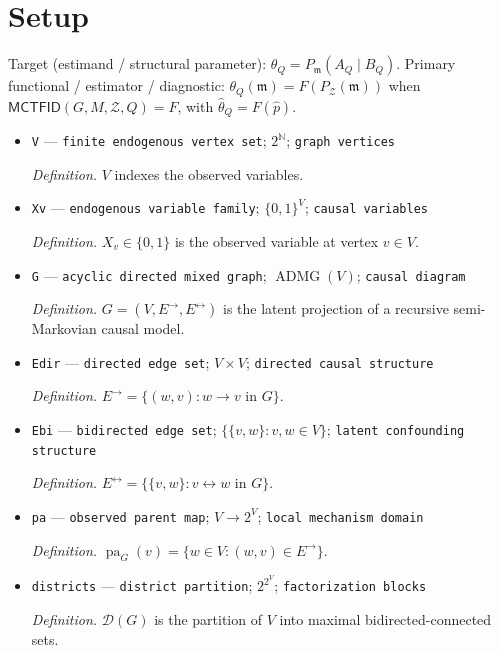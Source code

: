 \documentclass{article}
\begin{document}
\section{Setup}

Target (estimand / structural parameter): \(\theta_Q=P_{\mathfrak m}(A_Q\mid B_Q)\).
Primary functional / estimator / diagnostic: \(\theta_Q(\mathfrak m)=F(P_{\mathcal Z}(\mathfrak m))\) when \(\mathsf{MCTFID}(G,M,\mathcal Z,Q)=F\), with \(\widehat\theta_Q=F(\widehat p)\).
\begin{itemize}
  \item \texttt{V} --- \texttt{finite endogenous vertex set}; \(2^{\mathbb N}\); \texttt{graph vertices}
  \par\smallskip\noindent\emph{Definition.} \(V\) indexes the observed variables.
  \item \texttt{Xv} --- \texttt{endogenous variable family}; \(\{0,1\}^{V}\); \texttt{causal variables}
  \par\smallskip\noindent\emph{Definition.} \(X_v\in\{0,1\}\) is the observed variable at vertex \(v\in V\).
  \item \texttt{G} --- \texttt{acyclic directed mixed graph}; \(\operatorname{ADMG}(V)\); \texttt{causal diagram}
  \par\smallskip\noindent\emph{Definition.} \(G=(V,E^{\to},E^{\leftrightarrow})\) is the latent projection of a recursive semi-Markovian causal model.
  \item \texttt{Edir} --- \texttt{directed edge set}; \(V\times V\); \texttt{directed causal structure}
  \par\smallskip\noindent\emph{Definition.} \(E^{\to}=\{(w,v):w\to v\text{ in }G\}\).
  \item \texttt{Ebi} --- \texttt{bidirected edge set}; \(\{\{v,w\}:v,w\in V\}\); \texttt{latent confounding structure}
  \par\smallskip\noindent\emph{Definition.} \(E^{\leftrightarrow}=\{\{v,w\}:v\leftrightarrow w\text{ in }G\}\).
  \item \texttt{pa} --- \texttt{observed parent map}; \(V\to 2^V\); \texttt{local mechanism domain}
  \par\smallskip\noindent\emph{Definition.} \(\operatorname{pa}_G(v)=\{w\in V:(w,v)\in E^{\to}\}\).
  \item \texttt{districts} --- \texttt{district partition}; \(2^{2^V}\); \texttt{factorization blocks}
  \par\smallskip\noindent\emph{Definition.} \(\mathcal D(G)\) is the partition of \(V\) into maximal bidirected-connected sets.

\end{itemize}
\end{document}
